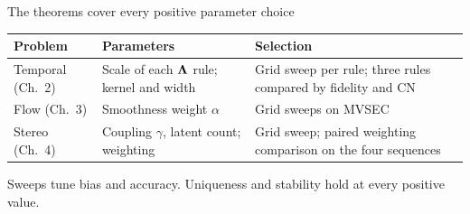 \begin{frame}[t,label=paramchoice]{The theorems cover every positive parameter choice}
\footnotesize
{\scriptsize\renewcommand{\arraystretch}{1.08}
\begin{tabular}{@{}p{}p{}p{}@{}}\toprule
Problem & Parameters & Selection\\\midrule
Temporal (Ch.~2) & Scale of each $\bm\Lambda$ rule; kernel and width & Grid sweep per rule; three rules compared by fidelity and CN\\
Flow (Ch.~3) & Smoothness weight $\alpha$ & Grid sweeps on MVSEC\\
Stereo (Ch.~4) & Coupling $\gamma$, latent count; weighting & Grid sweep; paired weighting comparison on the four sequences\\\bottomrule
\end{tabular}\par}
\vfill
{\small Sweeps tune bias and accuracy. Uniqueness and stability hold at every positive value.\par}
\vfill

\end{frame}
